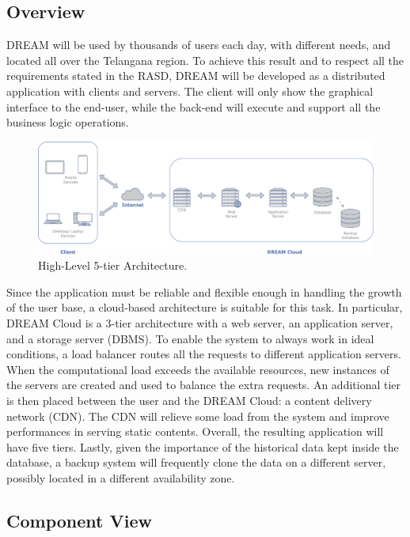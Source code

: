 \subsection{Overview}
\label{sect:overview}
DREAM will be used by thousands of users each day, with different needs, and located all over the Telangana region. To achieve this result and to respect all the requirements stated in the RASD, DREAM will be developed as a distributed application with clients and servers. The client will only show the graphical interface to the end-user, while the back-end will execute and support all the business logic operations. 
\begin{figure}[hbt!]
\centering
\includegraphics[width=\textwidth]{../images_diagrams/dd/highlevel_arch.png}
\caption{High-Level 5-tier Architecture.}
\label{fig:highLevelArch}
\end{figure}

\noindent
Since the application must be reliable and flexible enough in handling the growth of the user base, a cloud-based architecture is suitable for this task. In particular, DREAM Cloud is a 3-tier architecture with a web server, an application server, and a storage server (DBMS). To enable the system to always work in ideal conditions, a load balancer routes all the requests to different application servers. When the computational load exceeds the available resources, new instances of the servers are created and used to balance the extra requests. An additional tier is then placed between the user and the DREAM Cloud: a content delivery network (CDN). The CDN will relieve some load from the system and improve performances in serving static contents. Overall, the resulting application will have five tiers. Lastly, given the importance of the historical data kept inside the database, a backup system will frequently clone the data on a different server, possibly located in a different availability zone.

\subsection{Component View}

